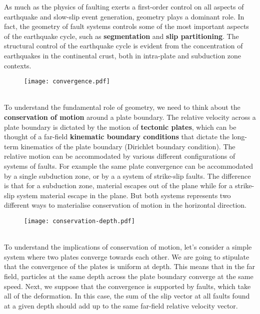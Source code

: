 \documentclass[letterpaper,12pt,]{memoir}
\begin{document}
As much as the physics of faulting exerts a first-order control on all aspects of earthquake and slow-slip event generation, geometry plays a dominant role. In fact, the geometry of fault systems controls some of the most important aspects of the earthquake cycle, such as \textbf{segmentation} and \textbf{slip partitioning}. The structural control of the earthquake cycle is evident from the concentration of earthquakes in the continental crust, both in intra-plate and subduction zone contexts.\\
%
\begin{figure}[h]
\texttt{[image: convergence.pdf]}
\end{figure}
%
\\
To understand the fundamental role of geometry, we need to think about the \textbf{conservation of motion} around a plate boundary. The relative velocity across a plate boundary is dictated by the motion of \textbf{tectonic plates}, which can be thought of a far-field \textbf{kinematic boundary conditions} that dictate the long-term kinematics of the plate boundary (Dirichlet boundary condition). The relative motion can be accommodated by various different configurations of systems of faults. For example the same plate convergence can be accommodated by a single subduction zone, or by a a system of strike-slip faults. The difference is that for a subduction zone, material escapes out of the plane while for a strike-slip system material escape in the plane. But both systems represents two different ways to materialise conservation of motion in the horizontal direction. \\
%
\begin{figure}[h]
\texttt{[image: conservation-depth.pdf]}
\end{figure}
%
\\
To understand the implications of conservation of motion, let's consider a simple system where two plates converge towards each other. We are going to stipulate that the convergence of the plates is uniform at depth. This means that in the far field, particles at the same depth across the plate boundary converge at the same speed. Next, we suppose that the convergence is supported by faults, which take all of the deformation. In this case, the sum of the slip vector at all faults found at a given depth should add up to the same far-field relative velocity vector.\\
\\
\end{document}
